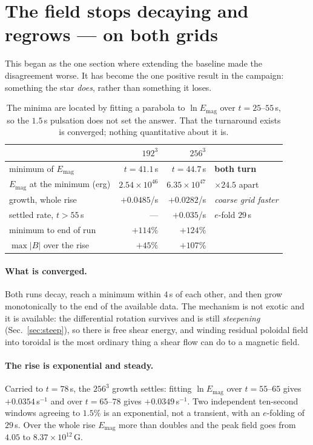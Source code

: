 \documentclass[11pt,a4paper]{article}
\newcommand{\Emag}{E_{\mathrm{mag}}}
\begin{document}
\section{The field stops decaying and regrows --- on both grids}
\label{sec:residual}

This began as the one section where extending the baseline made the
disagreement worse. It has become the one positive result in the campaign:
something the star \emph{does}, rather than something it loses.

\begin{table}[h]
\centering\small
\begin{tabular}{lrrl}
\toprule
& $192^3$ & $256^3$ & \\
\midrule
minimum of $\Emag$ & $t = 41.1$\,s & $t = 44.7$\,s & \textbf{both turn} \\
$\Emag$ at the minimum (erg) & $2.54\times10^{46}$ & $6.35\times10^{47}$ & $\times 24.5$ apart \\
growth, whole rise & $+0.0485$/s & $+0.0282$/s & \emph{coarse grid faster} \\
\quad settled rate, $t>55$\,s & --- & $+0.035$/s & $e$-fold $29$\,s \\
minimum to end of run & $+114\%$ & $+124\%$ & \\
$\max|B|$ over the rise & $+45\%$ & $+107\%$ & \\
\bottomrule
\end{tabular}
\caption{The minima are located by fitting a parabola to $\ln\Emag$ over
$t = 25$--$55$\,s, so the $1.5$\,s pulsation does not set the answer. That the
turnaround exists is converged; nothing quantitative about it is.}
\label{tab:turn}
\end{table}

\paragraph{What is converged.} Both runs decay, reach a minimum within $4$\,s
of each other, and then grow monotonically to the end of the available data.
The mechanism is not exotic and it is available: the differential rotation
survives and is still \emph{steepening} (Sec.~\ref{sec:steep}), so there
is free shear energy, and winding residual poloidal field into toroidal is the
most ordinary thing a shear flow can do to a magnetic field.

\paragraph{The rise is exponential and steady.} Carried to $t = 78$\,s, the
$256^3$ growth settles: fitting $\ln\Emag$ over $t = 55$--$65$ gives
$+0.0354$\,s$^{-1}$ and over $t = 65$--$78$ gives $+0.0349$\,s$^{-1}$. Two
independent ten-second windows agreeing to $1.5\%$ is an exponential, not a
transient, with an $e$-folding of $29$\,s. Over the whole rise $\Emag$ more
than doubles and the peak field goes from $4.05$ to $8.37\times10^{12}$\,G.
\end{document}
